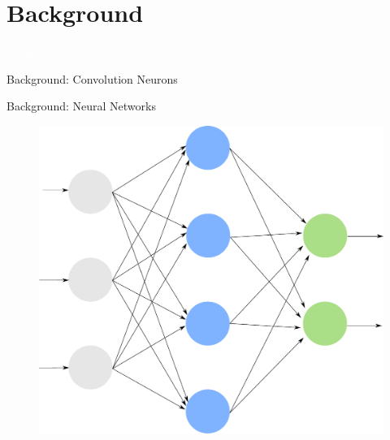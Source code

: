 \documentclass[xcolor=dvipsnames]{beamer}
\begin{document}
\section{Background}

{
\begin{frame}
    \centering
    \textcolor{white}{\LARGE Background}
\end{frame}
}










\begin{frame}{Background: Convolution Neurons}
\centering
{}
\end{frame}





\begin{frame}{Background: Neural Networks}

\begin{figure}
    \centering
    \includegraphics[width=0.6\linewidth]{images/neural_network.pdf}
\end{figure}
\end{frame}
\end{document}
